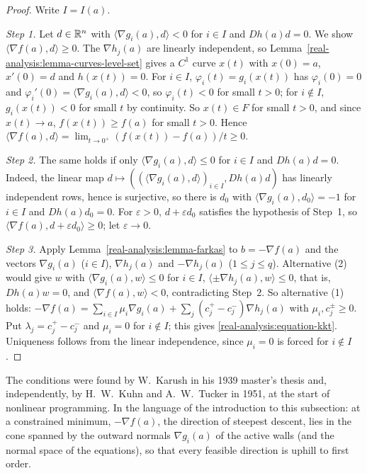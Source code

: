 \begin{proof}
Write $I = I(a)$.

\emph{Step 1.} Let $d \in \mathbb{R}^n$ with $\langle\nabla g_i(a), d\rangle < 0$ for $i \in I$ and $Dh(a)d = 0$. We show $\langle\nabla f(a), d\rangle \geq 0$. The $\nabla h_j(a)$ are linearly independent, so
Lemma~\ref{real-analysis:lemma-curves-level-set} gives a $C^1$ curve $x(t)$ with $x(0) = a$, $x'(0) = d$ and $h(x(t)) = 0$. For $i \in I$, $\varphi_i(t) = g_i(x(t))$ has $\varphi_i(0) = 0$ and
$\varphi_i'(0) = \langle\nabla g_i(a), d\rangle < 0$, so $\varphi_i(t) < 0$ for small $t > 0$; for $i \notin I$, $g_i(x(t)) < 0$ for small $t$ by continuity. So $x(t) \in F$ for small $t > 0$, and since
$x(t) \to a$, $f(x(t)) \geq f(a)$ for small $t > 0$. Hence $\langle\nabla f(a), d\rangle = \lim_{t \to 0^+}(f(x(t)) - f(a))/t \geq 0$.

\emph{Step 2.} The same holds if only $\langle\nabla g_i(a), d\rangle \leq 0$ for $i \in I$ and $Dh(a)d = 0$. Indeed, the linear map $d \mapsto ((\langle\nabla g_i(a), d\rangle)_{i \in I}, Dh(a)d)$ has linearly
independent rows, hence is surjective, so there is $d_0$ with $\langle\nabla g_i(a), d_0\rangle = -1$ for $i \in I$ and $Dh(a)d_0 = 0$. For $\varepsilon > 0$, $d + \varepsilon d_0$ satisfies the hypothesis of
Step~1, so $\langle\nabla f(a), d + \varepsilon d_0\rangle \geq 0$; let $\varepsilon \to 0$.

\emph{Step 3.} Apply Lemma~\ref{real-analysis:lemma-farkas} to $b = -\nabla f(a)$ and the vectors $\nabla g_i(a)$ ($i \in I$), $\nabla h_j(a)$ and $-\nabla h_j(a)$ ($1 \leq j \leq q$). Alternative (2) would give
$w$ with $\langle\nabla g_i(a), w\rangle \leq 0$ for $i \in I$, $\langle\pm\nabla h_j(a), w\rangle \leq 0$, that is, $Dh(a)w = 0$, and $\langle\nabla f(a), w\rangle < 0$, contradicting Step~2. So alternative (1)
holds: $-\nabla f(a) = \sum_{i \in I}\mu_i\nabla g_i(a) + \sum_j(c_j^+ - c_j^-)\nabla h_j(a)$ with $\mu_i, c_j^\pm \geq 0$. Put $\lambda_j = c_j^+ - c_j^-$ and $\mu_i = 0$ for $i \notin I$; this gives
\eqref{real-analysis:equation-kkt}. Uniqueness follows from the linear independence, since $\mu_i = 0$ is forced for $i \notin I$.
\end{proof}

The conditions were found by W.~Karush in his 1939 master's thesis and, independently, by H.~W.~Kuhn and A.~W.~Tucker in 1951, at the start of nonlinear programming. In the language of the
introduction to this subsection: at a constrained minimum, $-\nabla f(a)$, the direction of steepest descent, lies in the cone spanned by the outward normals $\nabla g_i(a)$ of the active walls (and the
normal space of the equations), so that every feasible direction is uphill to first order.

